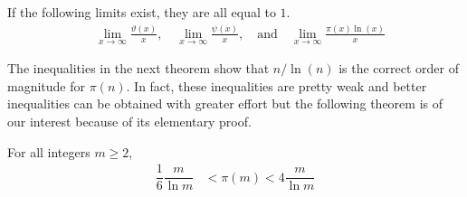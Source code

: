 	\begin{theorem}
		\label{thm:chebyshevestimates}
		If the following limits exist, they are all equal to $1$.
		\begin{align}
			&\lim_{x \to \infty} \frac{\vartheta(x)}{x}, \quad \lim_{x \to \infty} \frac{\psi(x)}{x}, \quad \text{and} \quad
			\lim_{x \to \infty} \frac{\pi(x) \ln(x)}{x} \label{eq:chebyshevestimates:eq1}
		\end{align}
	\end{theorem}


The inequalities in the next theorem show that $n/\ln(n)$ is the correct order of magnitude for $\pi(n)$. In fact, these inequalities are pretty weak and better inequalities can be obtained with greater effort but the following theorem is of our interest because of its elementary proof.

	\begin{theorem}
	\label{thm:pi(n)approximation}
		For all integers $m\geq2$,
		\begin{align}
			\dfrac{1}{6}\dfrac{m}{\ln m}
				& <\pi(m)<4\dfrac{m}{\ln m}\label{eq:pi(n)approximation:0}
		\end{align}
	\end{theorem}

